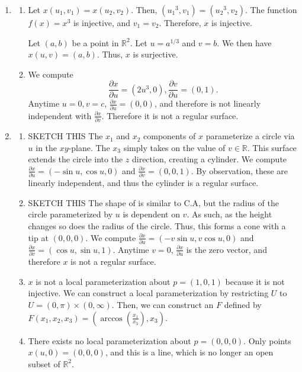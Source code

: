 \documentclass[12pt]{article}
\newcommand{\pderiv}[2][]{\frac{\partial#1}{\partial#2}}
\begin{document}
\begin{enumerate}[label=\Alph*., leftmargin=*]
\begin{enumerate}[label=.\Alph*]
When $\text{rank } A = 2$, then $x$ is a regular surface.
\end{enumerate}
\item \begin{enumerate}[label=.\Alph*]
    \item Let $x(u_1,v_1)=x(u_2,v_2)$. Then, $({u_1}^3,v_1)=({u_2}^3,v_2)$. The function $f(x)=x^3$ is injective, and $v_1=v_2$. Therefore, $x$ is injective. \par Let $(a,b)$ be a point in $\mathbb{R}^2$. Let $u=a^{1/3}$ and $v=b$. We then have $x(u,v)=(a,b)$. Thus, $x$ is surjective.
    \item We compute\begin{equation*}
        \pderiv[x]{u}=(2u^3,0), \pderiv[v]{u}=(0,1).
    \end{equation*}
    Anytime $u=0, v=c$, $\pderiv[x]{u}=(0,0)$, and therefore is not linearly independent with $\pderiv[x]{v}$. Therefore it is not a regular surface.
\end{enumerate}
\item \begin{enumerate}[label=.\Alph*]
    \item SKETCH THIS The $x_1$ and $x_2$ components of $x$ parameterize a circle via $u$ in the $xy$-plane. The $x_3$ simply takes on the value of $v\in \mathbb{R}$. This surface extends the circle into the $z$ direction, creating a cylinder. We compute
          $\pderiv[x]{u}=(-\sin u, \cos u, 0)$ and $\pderiv[x]{v}=(0,0,1)$. By observation, these are linearly independent, and thus the cylinder is a regular surface.
    \item SKETCH THIS The shape of is similar to C.A, but the radius of the circle parameterized by $u$ is dependent on $v$. As such, as the height changes so does the radius of the circle. Thus, this forms a cone with a tip at $(0,0,0)$. We compute 
          $\pderiv[x]{u}=(-v\sin u, v\cos u, 0)$ and $\pderiv[x]{v}=(\cos u, \sin u, 1)$. Anytime $v=0$, $\pderiv[x]{u}$ is the zero vector, and therefore $x$ is not a regular surface.
    \item $x$ is not a local parameterization about $p=(1,0,1)$ because it is not injective. We can construct a local parameterization by
          restricting $U$ to $U=(0,\pi)\times(0,\infty)$. Then, we can construct an $F$ defined by $F(x_1, x_2, x_3)=(\arccos(\frac{x_1}{x_3}),x_3)$.
    \item There exists no local parameterization about $p=(0,0,0)$. Only points $x(u,0)=(0,0,0)$, and this is a line, which is no longer an open subset of $\mathbb{R}^2$.
\end{enumerate}
\end{enumerate}
\end{document}
